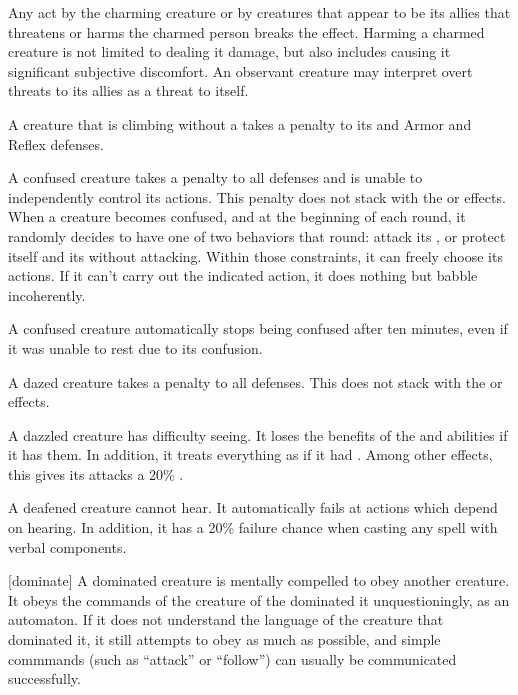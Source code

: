     Any act by the charming creature or by creatures that appear to be its allies that threatens or harms the charmed person breaks the effect.
    Harming a charmed creature is not limited to dealing it damage, but also includes causing it significant subjective discomfort.
    An observant creature may interpret overt threats to its allies as a threat to itself.

     A creature that is climbing without a  takes a  penalty to its  and Armor and Reflex defenses.

     A confused creature takes a  penalty to all defenses and is unable to independently control its actions.
    This penalty does not stack with the \dazed or \stunned effects.
    When a creature becomes confused, and at the beginning of each round, it randomly decides to have one of two behaviors that round: attack its , or protect itself and its  without attacking.
    Within those constraints, it can freely choose its actions.
    If it can't carry out the indicated action, it does nothing but babble incoherently.

    A confused creature automatically stops being confused after ten minutes, even if it was unable to rest due to its confusion.

     A dazed creature takes a  penalty to all defenses.
    This does not stack with the \stunned or \confused effects.

     A dazzled creature has difficulty seeing.
    It loses the benefits of the  and  abilities if it has them.
    In addition, it treats everything as if it had .
    Among other effects, this gives its  attacks a 20\% .

     A deafened creature cannot hear. It automatically fails at actions which depend on hearing. In addition, it has a 20\% failure chance when casting any spell with verbal components.

    [dominate] A dominated creature is mentally compelled to obey another creature.
    It obeys the commands of the creature of the dominated it unquestioningly, as an automaton.
    If it does not understand the language of the creature that dominated it, it still attempts to obey as much as possible, and simple commmands (such as ``attack'' or ``follow'') can usually be communicated successfully.


